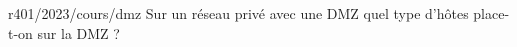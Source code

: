 \begin{question}{r401/2023/cours/dmz}
  Sur un réseau privé avec une DMZ quel type d'hôtes place-t-on sur la
  DMZ ?
  \begin{reponseshoriz}
  \end{reponseshoriz}
\end{question}
